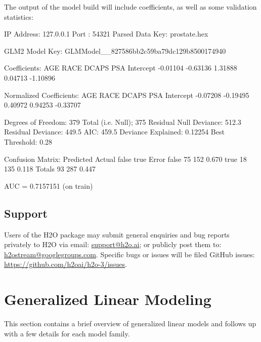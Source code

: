 \documentclass[11pt]{article}
\begin{document}
\vspace{10 mm}
\noindent
The output of the model build will include coefficients, as well as some validation statistics:

\begin{spverbatim}       
IP Address: 127.0.0.1 
Port      : 54321 
Parsed Data Key: prostate.hex 

GLM2 Model Key: GLMModel__827586bb2c59ba79dc129b8500174940

Coefficients:
      AGE      RACE     DCAPS       PSA Intercept 
 -0.01104  -0.63136   1.31888   0.04713  -1.10896 

Normalized Coefficients:
      AGE      RACE     DCAPS       PSA Intercept 
 -0.07208  -0.19495   0.40972   0.94253  -0.33707 

Degrees of Freedom: 379 Total (i.e. Null);  375 Residual
Null Deviance:     512.3
Residual Deviance: 449.5  AIC: 459.5
Deviance Explained: 0.12254 
 Best Threshold: 0.28

Confusion Matrix:
        Predicted
Actual   false true Error
  false     75  152 0.670
  true      18  135 0.118
  Totals    93  287 0.447

AUC =  0.7157151 (on train)
\end{spverbatim}

\subsection{Support} 

Users of the H2O package may submit general enquiries and bug reports privately to H2O via email: \url {support@h2o.ai}; or publicly post them to: \url {h2ostream@googlegroups.com}. Specific bugs or issues will be filed GitHub issues: 
\url{https://github.com/h2oai/h2o-3/issues}.

\section{Generalized Linear Modeling} 
This section contains a brief overview of generalized linear models and follows up with a few details for each model family.
\end{document}
